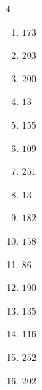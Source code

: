 \begin{multicols}{4}
\begin{enumerate}
  \item $173$


  \item $203$


  \item $200$


  \item $13$


  \item $155$


  \item $109$


  \item $251$


\columnbreak %

  \item $13$


  \item $182$


  \item $158$


  \item $86$


  \item $190$


  \item $135$


  \item $116$


  \item $252$


  \item $202$


\end{enumerate}
\end{multicols}
